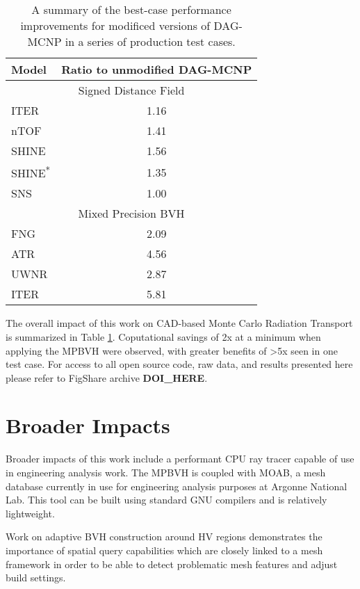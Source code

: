 \begin{table}[H]
  \small
  \centering
  \begin{tabular}{lc}
    \toprule
    Model & Ratio to unmodified DAG-MCNP \\
    \hline
    \multicolumn{2}{c}{Signed Distance Field} \\
    \hline
    ITER  & 1.16 \\
    nTOF  & 1.41 \\
    SHINE & 1.56 \\
    SHINE\textsuperscript{*} & 1.35 \\
    SNS   & 1.00 \\
    \hline
    \multicolumn{2}{c}{Mixed Precision BVH} \\
    \hline
    FNG  & 2.09  \\
    ATR  & 4.56  \\
    UWNR & 2.87  \\
    ITER & 5.81  \\
    \bottomrule
  \end{tabular}
  \caption[A summary of performance improvements in this work]{A summary of the
    best-case performance improvements for modificed versions of DAG-MCNP in a
    series of production test cases.}
  \label{tab:the_rub}
\end{table}

The overall impact of this work on CAD-based Monte Carlo Radiation Transport is
summarized in Table \ref{tab:the_rub}. Coputational savings of 2x at a minimum
when applying the MPBVH were observed, with greater benefits of >5x seen in one
test case. For access to all open source code, raw data, and results presented
here please refer to FigShare archive \textbf{DOI\_HERE}.

\section{Broader Impacts}\label{sec:other_contrib}

Broader impacts of this work include a performant CPU ray tracer capable of
use in engineering analysis work. The MPBVH is coupled with MOAB, a mesh
database currently in use for engineering analysis purposes at Argonne National
Lab. This tool can be built using standard GNU compilers and is relatively
lightweight.

Work on adaptive BVH construction around HV regions demonstrates the importance
of spatial query capabilities which are closely linked to a mesh framework in
order to be able to detect problematic mesh features and adjust build settings.

